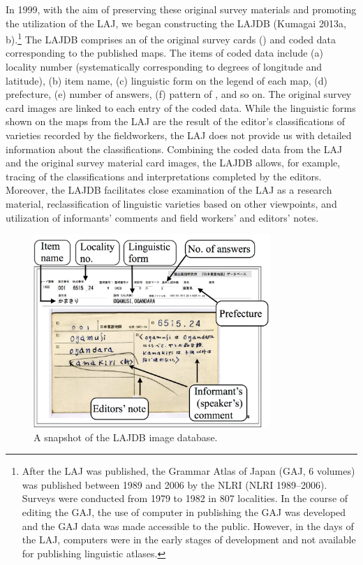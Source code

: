 \documentclass[output=paper]{LSP/langsci}
\begin{document}
In 1999, with the aim of preserving these original survey materials and promoting the utilization of the LAJ, we began constructing the LAJDB (Kumagai 2013a, b).\footnote{ After the LAJ was published, the Grammar Atlas of Japan (GAJ, 6 volumes) was published between 1989 and 2006 by the NLRI (NLRI 1989–2006). Surveys were conducted from 1979 to 1982 in 807 localities. In the course of editing the GAJ, the use of computer in publishing the GAJ was developed and the GAJ data was made accessible to the public. However, in the days of the LAJ, computers were in the early stages of development and not available for publishing linguistic atlases.} The LAJDB comprises an  of the original survey cards () and coded data corresponding to the published maps. The items of coded data include (a) locality number (systematically corresponding to degrees of longitude and latitude), (b) item name, (c) linguistic form on the legend of each map, (d) prefecture, (e) number of answers, (f) pattern of , and so on. The original survey card images are linked to each entry of the coded data. While the linguistic forms shown on the maps from the LAJ are the result of the editor’s classifications of varieties recorded by the fieldworkers, the LAJ does not provide us with detailed information about the classifications. Combining the coded data from the LAJ and the original survey material card images, the LAJDB allows, for example, tracing of the classifications and interpretations completed by the editors. Moreover, the LAJDB facilitates close examination of the LAJ as a research material, reclassification of linguistic varieties based on other viewpoints, and utilization of informants’ comments and field workers’ and editors’ notes.


\begin{figure}[t]
\includegraphics[width=0.8\textwidth]{illustrations/kuma_fig02}
\caption{A snapshot of the LAJDB image database.}        
\label{fig:kuma:2}
\end{figure} 
\end{document}
